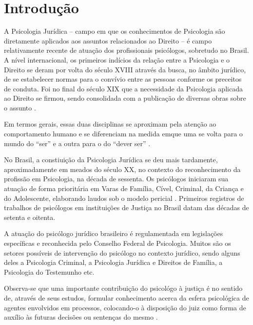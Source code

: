 
\chapter*[Introdução]{Introdução}

A Psicologia Jurídica -- campo em que os conhecimentos de Psicologia são diretamente aplicados aos assuntos relacionados ao Direito -- é campo relativamente recente de atuação dos profissionais psicólogos, sobretudo no Brasil. A nível internacional, os primeiros indícios da relação entre a Psicologia e o Direito se deram por volta do século XVIII através da busca, no âmbito jurídico, de se estabelecer normas para o convívio entre as pessoas conforme os preceitos de conduta. Foi no final do século XIX que a necessidade da Psicologia aplicada ao Direito se firmou, sendo consolidada com a publicação de diversas obras sobre o assunto \cite{jesus01}.

Em termos gerais, essas duas disciplinas se aproximam pela atenção ao comportamento humano e se diferenciam na medida emque uma se volta para o mundo do ``ser'' e a outra para o do ``dever ser'' .

No Brasil, a constiuição da Psicologia Jurídica se deu mais tardamente, aproximadamente em meados do século XX, no contexto do reconhecimento da profissão em Psicologia, na década de sessenta. Os psicólogos iniciaram sua atuação de forma prioritária em Varas de Família, Cível, Criminal, da Criança e do Adolescente, elaborando laudos sob o modelo pericial \cite{costa09}. Primeiros  registros de trabalhos de psicólogos em instituições de Justiça no Brasil datam das décadas de setenta e oitenta.

A atuação do psicólogo jurídico brasileiro é regulamentada em legislações específicas e reconhecida pelo Conselho Federal de Psicologia. Muitos são os setores possíveis de intervenção do psicólogo no contexto jurídico, sendo alguns deles a Psicologia Criminal, a Psicologia Jurídica e Direitos de Família, a Psicologia do Testemunho etc. 

Observa-se que uma importante contribuição do psicológo à justiça é no sentido de, através de seus estudos, formular conhecimento acerca da esfera psicológica de agentes envolvidos em processos, colocando-o à disposição do juiz como forma de auxílio às futuras decisões ou sentenças do mesmo .

